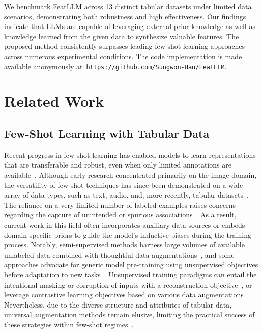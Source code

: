 We benchmark \textsf{FeatLLM} across 13 distinct tabular datasets under limited data scenarios, demonstrating both robustness and high effectiveness. Our findings indicate that LLMs are capable of leveraging external prior knowledge as well as knowledge learned from the given data to synthesize valuable features. The proposed method consistently surpasses leading few-shot learning approaches across numerous experimental conditions. The code implementation is made available anonymously at~\texttt{https://github.com/Sungwon-Han/FeatLLM}.

\section{Related Work}

\subsection{Few-Shot Learning with Tabular Data} Recent progress in few-shot learning has enabled models to learn representations that are transferable and robust, even when only limited annotations are available~\cite{chen2018closer}. Although early research concentrated primarily on the image domain, the versatility of few-shot techniques has since been demonstrated on a wide array of data types, such as text, audio, and, more recently, tabular datasets~\cite{majumder2022few,nam2023stunt,schick2021exploiting}. The reliance on a very limited number of labeled examples raises concerns regarding the capture of unintended or spurious associations~\cite{bartlett2021deep}. As a result, current work in this field often incorporates auxiliary data sources or embeds domain-specific priors to guide the model's inductive biases during the training process. Notably, semi-supervised methods harness large volumes of available unlabeled data combined with thoughtful data augmentations~\cite{ucar2021subtab,yoon2020vime}, and some approaches advocate for generic model pre-training using unsupervised objectives before adaptation to new tasks~\cite{somepalli2021saint}. Unsupervised training paradigms can entail the intentional masking or corruption of inputs with a reconstruction objective~\cite{arik2021tabnet,majmundar2022met}, or leverage contrastive learning objectives based on various data augmentations~\cite{bahri2022scarf,chen2020simple}. Nevertheless, due to the diverse structure and attributes of tabular data, universal augmentation methods remain elusive, limiting the practical success of these strategies within few-shot regimes~\cite{nam2023stunt}.

